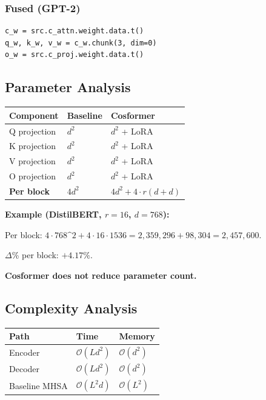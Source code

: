 \subsubsection{Fused (GPT-2)}

\begin{lstlisting}
c_w = src.c_attn.weight.data.t()
q_w, k_w, v_w = c_w.chunk(3, dim=0)
o_w = src.c_proj.weight.data.t()
\end{lstlisting}

\subsection{Parameter Analysis}

\begin{table}[H]
\centering
\small
\begin{tabular}{lll}
\toprule
\textbf{Component} & \textbf{Baseline} & \textbf{Cosformer} \\
\midrule
Q projection & $d^2$ & $d^2$ + LoRA \\
K projection & $d^2$ & $d^2$ + LoRA \\
V projection & $d^2$ & $d^2$ + LoRA \\
O projection & $d^2$ & $d^2$ + LoRA \\
\textbf{Per block} & $4d^2$ & $4d^2 + 4 \cdot r(d + d)$ \\
\bottomrule
\end{tabular}
\end{table}

\textbf{Example (DistilBERT, $r = 16$, $d = 768$):}

Per block: $4 \cdot 768\^{}2 + 4 \cdot 16 \cdot 1536 = 2{,}359{,}296 + 98{,}304 
= 2{,}457{,}600$.

$\Delta$\% per block: $+4.17\%$.

\textbf{Cosformer does not reduce parameter count.}

\subsection{Complexity Analysis}

\begin{table}[H]
\centering
\small
\begin{tabular}{lll}
\toprule
\textbf{Path} & \textbf{Time} & \textbf{Memory} \\
\midrule
Encoder & $\mathcal{O}(L d^2)$ & $\mathcal{O}(d^2)$ \\
Decoder & $\mathcal{O}(L d^2)$ & $\mathcal{O}(d^2)$ \\
Baseline MHSA & $\mathcal{O}(L^2 d)$ & $\mathcal{O}(L^2)$ \\
\bottomrule
\end{tabular}
\end{table}

